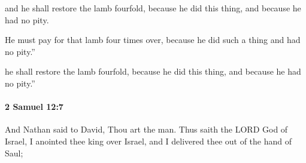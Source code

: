 			\begin{versebox}
					\item[BHS] 
					\item[ASV] and he shall restore the lamb fourfold, because he did this thing, and because he had no pity.
					\item[NIV] He must pay for that lamb four times over, because he did such a thing and had no pity.”
					\item[NRSV] he shall restore the lamb fourfold, because he did this thing, and because he had no pity.”
			\end{versebox}

		\paragraph{2 Samuel 12:7} %
			\label{2SAMUEL-12-7}

			And Nathan said to David, Thou art the man. Thus saith the LORD God of Israel, I anointed thee king over Israel, and I delivered thee out of the hand of Saul;

